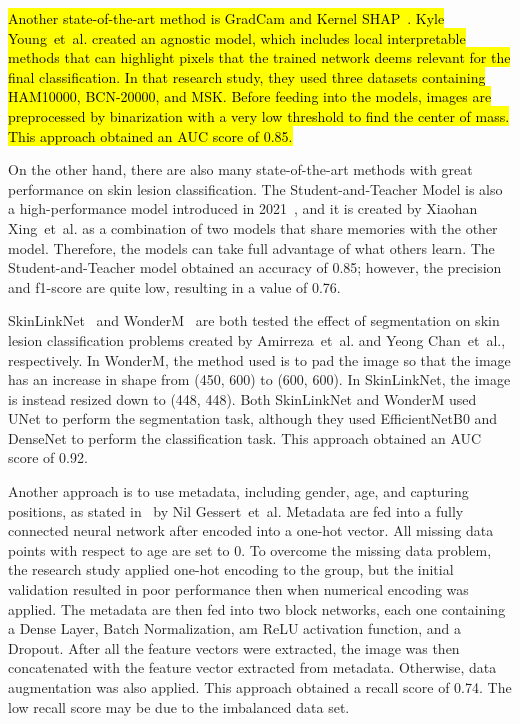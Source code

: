 \documentclass[sensors,article,accept,pdftex,moreauthors]{Definitions/mdpi}
\begin{document}
{		\hl{Another state-of-the-art method is GradCam and Kernel SHAP~\mbox{\cite{06612}}. Kyle Young~et~al. created an agnostic model, which includes local interpretable methods that can highlight pixels that the trained network deems relevant for the final classification. In that research study, they used three datasets containing HAM10000, BCN-20000, and MSK. Before feeding into the models,  images are preprocessed by binarization with a very low threshold to find the center of mass. This approach obtained an  AUC score of 0.85.} %
		
		On the other hand, there are also many state-of-the-art methods with great performance on skin lesion classification. The Student-and-Teacher Model is also a high-performance model introduced in 2021~\mbox{\cite{03225}}, and it is created by Xiaohan Xing~et~al. as a combination of two models that share  memories with the other model. Therefore, the models can take full advantage of what others learn. The Student-and-Teacher model obtained an accuracy of 0.85; however, the precision and f1-score are quite low, resulting in a value of 0.76.
		
		SkinLinkNet~\mbox{\cite{12602}} and WonderM~\mbox{\cite{03426}} are both tested the effect of segmentation on skin lesion classification problems created by Amirreza~et~al. and Yeong Chan~et~al., respectively. In WonderM, the method used is to pad the image so that the image has an increase in shape  from (450, 600) to (600, 600). In SkinLinkNet,  the image is instead resized down to (448, 448). Both  SkinLinkNet and WonderM used UNet to perform the segmentation task, although they used EfficientNetB0 and DenseNet to perform the classification task. This approach obtained an AUC score of 0.92.
		
		Another approach is to use metadata, including gender, age, and capturing positions, as stated in~\mbox{\cite{03910}} by Nil Gessert~et~al.  Metadata are fed into a fully connected neural network after  encoded into a one-hot vector. All missing data points with respect to age are set to 0. To overcome the missing data problem, the research study applied one-hot encoding to the group, but the initial validation resulted in poor performance then when numerical encoding was applied. The metadata are then fed into two block networks, each one containing a Dense Layer, Batch Normalization, am ReLU activation function, and a Dropout. After all the feature vectors were extracted, the image was then concatenated with the feature vector extracted from metadata. Otherwise,  data augmentation was also applied. This approach obtained a  recall score of 0.74. The low recall score may be due to the imbalanced data set.
		
}
\end{document}
